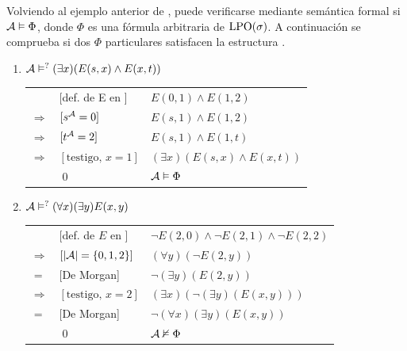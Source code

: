 Volviendo al ejemplo anterior de \A, puede verificarse mediante semántica 
formal si $\mathcal{A}\vDash\Phi$, donde $\Phi$
es una fórmula arbitraria de $\text{LPO}(\sigma)$. A continuación se comprueba si dos
$\Phi$ particulares satisfacen la estructura \A.

\begin{enumerate}
\item $\mathcal{A}\vDash^?(\exists x)(E(s,x)\land E(x,t))$
\begin{center}
\begin{tabular}{lll}
&[def. de E en \A] & $E(0, 1) \land E(1, 2)$\\
$\Rightarrow$ & $[s^{\mathcal{A}} = 0]$ & $E(s, 1) \land E(1, 2)$\\
$\Rightarrow$ & $[t^{\mathcal{A}} = 2]$ & $E(s, 1) \land E(1, t)$\\
$\Rightarrow$ & $[\mbox{testigo, } x = 1]$ & $(\exists x)(E(s, x) \land E(x, t))$\\
&\qed & $\mathcal{A} \vDash \Phi$
\end{tabular}
\end{center}

\item $\mathcal{A}\vDash^?(\forall x)(\exists y)E(x,y)$
\begin{center}
\begin{tabular}{lll}
&[def. de $E$ en \A] & $\neg E(2, 0) \land \neg E(2, 1) \land \neg E(2, 2)$\\
$\Rightarrow$ & $[|\mathcal{A}| = \{0,1,2\}]$ & $(\forall y) (\neg E(2, y))$\\
$=$ & [De Morgan] & $\neg (\exists y) (E(2, y))$\\
$\Rightarrow$ & $[\mbox{testigo, } x = 2]$ & $(\exists x) (\neg (\exists y) (E(x, y)))$\\
$=$ & [De Morgan] & $\neg (\forall x) (\exists y) (E(x, y))$\\
&\qed & $\mathcal{A} \nvDash \Phi$
\end{tabular}
\end{center}
\end{enumerate}

